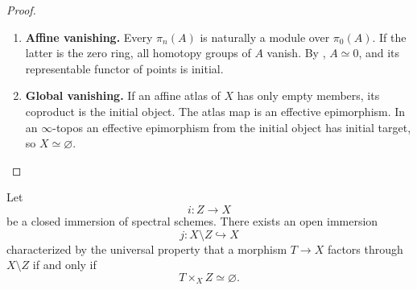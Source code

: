 \begin{proof}
\leavevmode
\begin{enumerate}[label=\textup{(\arabic*)}]
    \item \textbf{Affine vanishing.}
    Every \(\pi_n(A)\) is naturally a module over \(\pi_0(A)\). If the
    latter is the zero ring, all homotopy groups of \(A\) vanish. By
    , \(A\simeq0\), and its
    representable functor of points is initial.

    \item \textbf{Global vanishing.}
    If an affine atlas of \(X\) has only empty members, its coproduct is the
    initial object. The atlas map is an effective epimorphism. In an
    \(\infty\)-topos an effective epimorphism from the initial object has
    initial target, so \(X\simeq\varnothing\).
\end{enumerate}
\end{proof}

\begin{theorem}
\label{thm:complement-closed-immersion}
Let
\[
    i:Z\longrightarrow X
\]
be a closed immersion of spectral schemes. There exists an open immersion
\[
    j:X\setminus Z\hookrightarrow X
\]
characterized by the universal property that a morphism \(T\to X\) factors
through \(X\setminus Z\) if and only if
\[
    T\times_XZ\simeq\varnothing.
\]
\end{theorem}

